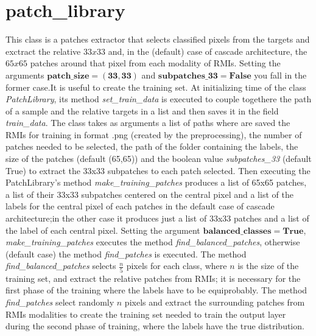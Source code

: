 \documentclass[openany,12pt,english]{book}
\begin{document}
	\section{patch\_library}
	This class is a patches extractor that selects classified pixels from the targets and exctract the relative $33x33$ and, in the (default) case of cascade architecture, the $65x65$ patches around that pixel from each modality of RMIs.
	Setting the arguments $\mathbf{patch\_size=(33,33)}$ and $\mathbf{subpatches\_33=False}$ you fall in the former case.It is useful to create the training set. At initializing time of the class \emph{PatchLibrary}, its method \emph{set\_train\_data} is executed to couple togethere the path of a sample and the relative targets in a list and then saves it in the field \emph{train\_data}. The class takes as arguments a list of paths where are saved the RMIs for training in format .png (created by the preprocessing), the number of patches needed to be selected, the path of the folder containing the labels, the size of the patches (default (65,65)) and the boolean value \emph{subpatches\_33} (default True) to extract the 33x33 subpatches to each patch selected.
	Then executing the PatchLibrary's method \emph{make\_training\_patches} produces a list of 65x65 patches, a list of their 33x33 subpatches centered on the central pixel and a list of the labels for the central pixel of each patches in the default case of cascade architecture;in the other case it produces just a list of 33x33 patches and a list of the label of each central pixel. Setting the argument $\mathbf{balanced\_classes=True}$, \emph{make\_training\_patches} executes the method \emph{find\_balanced\_patches}, otherwise (default case) the method \emph{find\_patches} is executed.
	The method \emph{find\_balanced\_patches} selects $\frac{n}{5}$ pixels for each class, where $n$ is the size of the training set, and extract the relative patches from RMIs; it is necessary for the first phase of the training where the labels have to be equiprobably.
	The method \emph{find\_patches} select randomly $n$ pixels and extract the surrounding patches from RMIs modalities to create the training set needed to train the output layer during the second phase of training, where the labels have the true distribution.
\end{document}
